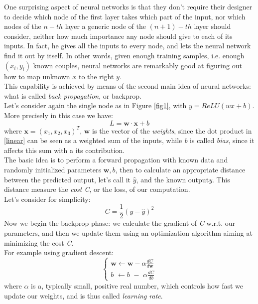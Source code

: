 \documentclass[12pt, a4paper]{report}
\theoremstyle{definition}
\begin{document}
\newline \noindent One surprising aspect of neural networks is that they don't require their designer to decide which node of the first layer takes which part of the input, nor which nodes of the $n\!-\!th$ layer a generic node of the $(n+1)\!-\!th$ layer should consider, neither how much importance any node should give to each of its inputs. In fact, he gives all the inputs to every node, and lets the neural network find it out by itself. In other words, given enough training samples, i.e. enough $(x_i,y_i)$ known couples, neural networks are remarkably good at figuring out how to map unknown $x$ to the right $y$.\\
This capability is achieved by means of the second main idea of neural networks: what is called \textit{back propagation}, or backprop.\\
Let's consider again the single node as in Figure \ref{fig1}, with $y=ReLU(wx+b)$. More precisely in this case we have:
\begin{equation}\label{linear}
L=\bm{w \cdot x} + b
\end{equation}
where $\bm x = (x_1,x_2,x_3)^T$, $\bm w$ is the vector of the \textit{weights}, since the dot product in \eqref{linear} can be seen as a weighted sum of the inputs, while \textit{b} is called \textit{bias}, since it affects this sum with a its contribution. \\
The basic idea is to perform a forward propagation with known data and randomly initialized parameters $\bm w,b$, then to calculate an appropriate distance between the predicted output, let's call it $\hat y$, and the known output\textit{y}.
This distance measure the \textit{cost C}, or the loss, of our computation.\\
Let's consider for simplicity:
\[
C=\frac{1}{2}(y-\hat y)^2
\]
Now we begin the backprop phase: we calculate the gradient of \textit{C} w.r.t. our parameters, and then we update them using an optimization algorithm aiming at minimizing the cost \textit{C}.\\
For example using gradient descent:
\begin{equation}\label{grad_desc}
\begin{cases}
\bm w \leftarrow \bm w - \alpha \frac{dC}{d\bm w} \\
b \,\,\leftarrow b\,\, - \,\,\alpha \frac{dC}{db}
\end{cases}
\end{equation}
where $\alpha$ is a, typically small, positive real number, which controls how fast we update our weights, and is thus called \textit{learning rate}.\\
\end{document}
